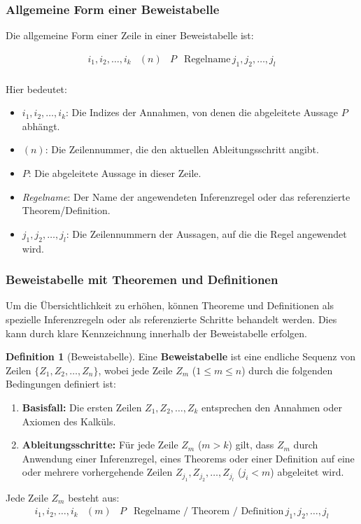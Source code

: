 \documentclass{book}
\theoremstyle{plain}
\theoremstyle{remark}
\theoremstyle{definition}
\newtheorem{definition}{Definition}[section]
\begin{document}
\subsubsection{Allgemeine Form einer Beweistabelle}

Die allgemeine Form einer Zeile in einer Beweistabelle ist:

\[
\begin{array}{llll}
	i_1, i_2, \ldots, i_k & (n) & P & \text{Regelname} \, j_1, j_2, \ldots, j_l \\
\end{array}
\]

Hier bedeutet:
\begin{itemize}
    \item \(i_1, i_2, \ldots, i_k\): Die Indizes der Annahmen, von denen die abgeleitete Aussage \(P\) abhängt.
    \item \((n)\): Die Zeilennummer, die den aktuellen Ableitungsschritt angibt.
    \item \(P\): Die abgeleitete Aussage in dieser Zeile.
    \item \textit{Regelname}: Der Name der angewendeten Inferenzregel oder das referenzierte Theorem/Definition.
    \item \(j_1, j_2, \ldots, j_l\): Die Zeilennummern der Aussagen, auf die die Regel angewendet wird.
\end{itemize}

\subsubsection{Beweistabelle mit Theoremen und Definitionen}

Um die Übersichtlichkeit zu erhöhen, können Theoreme und Definitionen als spezielle Inferenzregeln oder als referenzierte Schritte behandelt werden. Dies kann durch klare Kennzeichnung innerhalb der Beweistabelle erfolgen.

\begin{definition}[Beweistabelle]
Eine \textbf{Beweistabelle} ist eine endliche Sequenz von Zeilen \( \{Z_1, Z_2, \ldots, Z_n\} \), wobei jede Zeile \( Z_m \) (\(1 \leq m \leq n\)) durch die folgenden Bedingungen definiert ist:

\begin{enumerate}
    \item \textbf{Basisfall:} Die ersten Zeilen \( Z_1, Z_2, \ldots, Z_k \) entsprechen den Annahmen oder Axiomen des Kalküls.
    \item \textbf{Ableitungsschritte:} Für jede Zeile \( Z_m \) (\(m > k\)) gilt, dass \( Z_m \) durch Anwendung einer Inferenzregel, eines Theorems oder einer Definition auf eine oder mehrere vorhergehende Zeilen \( Z_{j_1}, Z_{j_2}, \ldots, Z_{j_l} \) (\(j_i < m\)) abgeleitet wird.
\end{enumerate}

Jede Zeile \( Z_m \) besteht aus:
\[
\begin{array}{llll}
	i_1, i_2, \ldots, i_k & (m) & P & \text{Regelname / Theorem / Definition} \, j_1, j_2, \ldots, j_l \\
\end{array}
\]
\end{definition}
\end{document}
